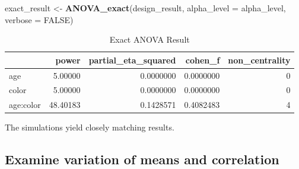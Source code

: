 \documentclass[
]{book}
\newenvironment{Shaded}{\begin{snugshade}}{\end{snugshade}}
\newcommand{\DataTypeTok}[1]{\textcolor[rgb]{0.13,0.29,0.53}{#1}}
\newcommand{\KeywordTok}[1]{\textcolor[rgb]{0.13,0.29,0.53}{\textbf{#1}}}
\newcommand{\NormalTok}[1]{#1}
\newcommand{\OtherTok}[1]{\textcolor[rgb]{0.56,0.35,0.01}{#1}}
\newcommand{\StringTok}[1]{\textcolor[rgb]{0.31,0.60,0.02}{#1}}
\begin{document}
\begin{Shaded}
\begin{Highlighting}[]
\NormalTok{exact_result <-}\StringTok{ }\KeywordTok{ANOVA_exact}\NormalTok{(design_result,}
                            \DataTypeTok{alpha_level =}\NormalTok{ alpha_level,}
                            \DataTypeTok{verbose =} \OtherTok{FALSE}\NormalTok{)}
\end{Highlighting}
\end{Shaded}

\begin{table}[!h]

\caption{\label{tab:unnamed-chunk-100}Exact ANOVA Result}
\centering
\begin{tabular}[t]{l|r|r|r|r}
\hline
  & power & partial\_eta\_squared & cohen\_f & non\_centrality\\
\hline
age & 5.00000 & 0.0000000 & 0.0000000 & 0\\
\hline
color & 5.00000 & 0.0000000 & 0.0000000 & 0\\
\hline
age:color & 48.40183 & 0.1428571 & 0.4082483 & 4\\
\hline
\end{tabular}
\end{table}

The simulations yield closely matching results.

\hypertarget{examine-variation-of-means-and-correlation}{%
\subsection{Examine variation of means and correlation}\label{examine-variation-of-means-and-correlation}}
\end{document}
